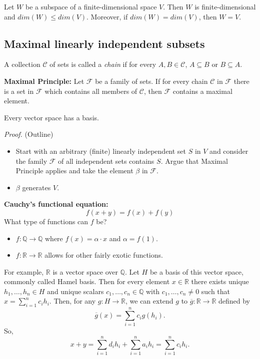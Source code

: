 \documentclass[12pt]{article}
\newenvironment{theorem}[2][Theorem]{\begin{trivlist}
\item[\hskip \labelsep {\bfseries #1}\hskip \labelsep {\bfseries #2.}]}{\end{trivlist}}
\newenvironment{definition}[2][Definition]{\begin{trivlist}
\item[\hskip \labelsep {\bfseries #1}\hskip \labelsep {\bfseries #2}]}{\end{trivlist}}
\begin{document}
\begin{theorem}{1.11}
Let $W$ be a subspace of a finite-dimensional space $V$. Then $W$ is finite-dimensional and $dim(W) \leq dim(V)$. Moreover, if $dim(W) = dim(V)$, then $W = V$.
\end{theorem}

\subsection{Maximal linearly independent subsets}

\begin{definition}{10}
A collection $\mathcal{C}$ of sets is called a \textit{chain} if for every $A, B \in \mathcal{C}$, $A \subseteq B$ or $B \subseteq A$.
\end{definition}

\noindent \textbf{Maximal Principle:} Let $\mathcal{F}$ be a family of sets. If for every chain $\mathcal{C}$ in $\mathcal{F}$ there is a set in $\mathcal{F}$ which contains all members of $\mathcal{C}$, then $\mathcal{F}$ contains a maximal element.

\begin{theorem}{1.12}
Every vector space has a basis.
\end{theorem}

\textit{Proof.} (Outline)
\begin{itemize}
    \item Start with an arbitrary (finite) linearly independent set $S$ in $V$ and consider the family $\mathcal{F}$ of all independent sets contains $S$. Argue that Maximal Principle applies and take the element $\beta$ in $\mathcal{F}$.
    \item $\beta$ generates $V$.
\end{itemize}

\noindent\textbf{Cauchy's functional equation:} $$f(x + y) = f(x) + f(y)$$ What type of functions can $f$ be?

\begin{itemize}
    \item[(1)] $f : \mathbb{Q} \to \mathbb{Q}$ where $f(x) = \alpha \cdot x$ and $\alpha = f(1)$.
    \item[(2)] $f : \mathbb{R} \to \mathbb{R}$ allows for other fairly exotic functions.
\end{itemize}
For example, $\mathbb{R}$ is a vector space over $\mathbb{Q}$. Let $H$ be a basis of this vector space, commonly called Hamel basis. Then for every element $x \in \mathbb{R}$ there exists unique $h_1, \dots, h_n \in H$ and unique scalars $c_1, \dots, c_n \in \mathbb{Q}$ with $c_1, \dots, c_n \neq 0$ such that $x = \sum_{i = 1}^nc_ih_i$. Then, for any $g : H \to \mathbb{R}$, we can extend $g$ to $\overline{g} : \mathbb{R} \to \mathbb{R}$ defined by $$\overline{g}(x) = \sum_{i = 1}^nc_ig(h_i).$$ So, $$x + y = \sum_{i = 1}^nd_ih_i + \sum_{i = 1}^na_ih_i = \sum_{i = 1}^nc_ih_i.$$
\end{document}
